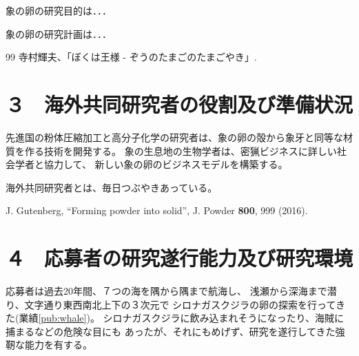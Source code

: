 \documentclass[11pt,a4j,dvipdfmx]{jarticle} 					%
\newcommand{\研究課題名}{象の卵}
\newcommand{\研究機関名}{逢坂大学}
\newcommand{\研究代表者氏名}{湯川秀樹}
\newcommand{\研究期間の最終元号年度}{11}  %
\begin{document}
	 象の卵の研究目的は．．．

	象の卵の研究計画は．．．

	\vspace{1cm}
	\begin{thebibliography}{99}
		 寺村輝夫、「ぼくは王様 - ぞうのたまごのたまごやき」.
	\end{thebibliography}




\section{３　海外共同研究者の役割及び準備状況}

	先進国の粉体圧縮加工と高分子化学の研究者は、象の卵の殻から象牙と同等な材質を作る技術を開発する。
	象の生息地の生物学者は、密猟ビジネスに詳しい社会学者と協力して、
	新しい象の卵のビジネスモデルを構築する。
	
	海外共同研究者とは、毎日つぶやきあっている。

	J. Gutenberg, ``Forming powder into solid'', J. Powder \textbf{800}, 999 (2016).
	
	




\section{４　応募者の研究遂行能力及び研究環境}

\PapersInstructions		%
	応募者は過去20年間、７つの海を隅から隅まで航海し、
	浅瀬から深海まで潜り、文字通り東西南北上下の３次元で
	シロナガスクジラの卵の探索を行ってきた(業績\ref{pub:whale})。
	シロナガスクジラに飲み込まれそうになったり、海賊に捕まるなどの危険な目にも
	あったが、それにもめげず、研究を遂行してきた強靭な能力を有する。
\end{document}
